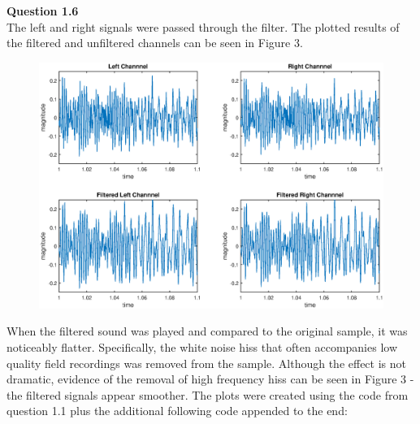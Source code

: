 \documentclass{article}
\begin{document}
	
	\textbf{Question 1.6}\\
	
    The left and right signals were passed through the filter. The plotted results of the filtered and unfiltered channels can be seen in Figure 3.
    
    \begin{figure}[H]
    	\centering
    	\includegraphics[scale=0.52]{fig3.eps}
    \end{figure}
    
    	When the filtered sound was played and compared to the original sample, it was noticeably flatter. Specifically, the white noise hiss that often accompanies low quality field recordings was removed from the sample. Although the effect is not dramatic, evidence of the removal of high frequency hiss can be seen in Figure 3 - the filtered signals appear smoother. The plots were created using the code from question 1.1 plus the additional following code appended to the end:
    
\end{document}
